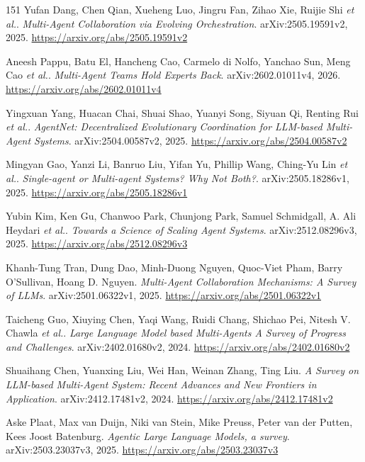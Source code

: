 \documentclass[11pt,a4paper]{article}
\begin{document}
\begin{thebibliography}{151}
Yufan Dang, Chen Qian, Xueheng Luo, Jingru Fan, Zihao Xie, Ruijie Shi \emph{et al.}.
\newblock \emph{Multi-Agent Collaboration via Evolving Orchestration}.
\newblock arXiv:2505.19591v2, 2025.
\newblock \url{https://arxiv.org/abs/2505.19591v2}

Aneesh Pappu, Batu El, Hancheng Cao, Carmelo di Nolfo, Yanchao Sun, Meng Cao \emph{et al.}.
\newblock \emph{Multi-Agent Teams Hold Experts Back}.
\newblock arXiv:2602.01011v4, 2026.
\newblock \url{https://arxiv.org/abs/2602.01011v4}

Yingxuan Yang, Huacan Chai, Shuai Shao, Yuanyi Song, Siyuan Qi, Renting Rui \emph{et al.}.
\newblock \emph{AgentNet: Decentralized Evolutionary Coordination for LLM-based Multi-Agent Systems}.
\newblock arXiv:2504.00587v2, 2025.
\newblock \url{https://arxiv.org/abs/2504.00587v2}

Mingyan Gao, Yanzi Li, Banruo Liu, Yifan Yu, Phillip Wang, Ching-Yu Lin \emph{et al.}.
\newblock \emph{Single-agent or Multi-agent Systems? Why Not Both?}.
\newblock arXiv:2505.18286v1, 2025.
\newblock \url{https://arxiv.org/abs/2505.18286v1}

Yubin Kim, Ken Gu, Chanwoo Park, Chunjong Park, Samuel Schmidgall, A. Ali Heydari \emph{et al.}.
\newblock \emph{Towards a Science of Scaling Agent Systems}.
\newblock arXiv:2512.08296v3, 2025.
\newblock \url{https://arxiv.org/abs/2512.08296v3}

Khanh-Tung Tran, Dung Dao, Minh-Duong Nguyen, Quoc-Viet Pham, Barry O'Sullivan, Hoang D. Nguyen.
\newblock \emph{Multi-Agent Collaboration Mechanisms: A Survey of LLMs}.
\newblock arXiv:2501.06322v1, 2025.
\newblock \url{https://arxiv.org/abs/2501.06322v1}

Taicheng Guo, Xiuying Chen, Yaqi Wang, Ruidi Chang, Shichao Pei, Nitesh V. Chawla \emph{et al.}.
\newblock \emph{Large Language Model based Multi-Agents A Survey of Progress and Challenges}.
\newblock arXiv:2402.01680v2, 2024.
\newblock \url{https://arxiv.org/abs/2402.01680v2}

Shuaihang Chen, Yuanxing Liu, Wei Han, Weinan Zhang, Ting Liu.
\newblock \emph{A Survey on LLM-based Multi-Agent System: Recent Advances and New Frontiers in Application}.
\newblock arXiv:2412.17481v2, 2024.
\newblock \url{https://arxiv.org/abs/2412.17481v2}

Aske Plaat, Max van Duijn, Niki van Stein, Mike Preuss, Peter van der Putten, Kees Joost Batenburg.
\newblock \emph{Agentic Large Language Models, a survey}.
\newblock arXiv:2503.23037v3, 2025.
\newblock \url{https://arxiv.org/abs/2503.23037v3}


\end{thebibliography}
\end{document}
